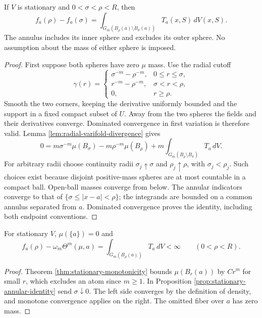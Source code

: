 \begin{proposition}\label{prop:stationary-annular-identity}
If $V$ is stationary and $0<\sigma<\rho<R$, then
\[
 f_a(\rho)-f_a(\sigma)
 =\int_{G_m(B_\rho(a)\setminus B_\sigma(a))}T_a(x,S)\,dV(x,S).
\]
The annulus includes its inner sphere and excludes its outer sphere. No assumption about the mass of either sphere is imposed.
\end{proposition}
\begin{proof}
First suppose both spheres have zero $\mu$ mass. Use the radial cutoff
\[
 \gamma(r)=\begin{cases}
 \sigma^{-m}-\rho^{-m},&0\leq r\leq\sigma,\\
 r^{-m}-\rho^{-m},&\sigma<r<\rho,\\
 0,&r\geq\rho.
 \end{cases}
\]
Smooth the two corners, keeping the derivative uniformly bounded and the support in a fixed compact subset of $U$. Away from the two spheres the fields and their derivatives converge. Dominated convergence in first variation is therefore valid. Lemma \ref{lem:radial-varifold-divergence} gives
\[
 0=m\sigma^{-m}\mu(B_\sigma)-m\rho^{-m}\mu(B_\rho)
   +m\int_{G_m(B_\rho\setminus B_\sigma)}T_a\,dV.
\]
For arbitrary radii choose continuity radii $\sigma_j\uparrow\sigma$ and $\rho_j\uparrow\rho$, with $\sigma_j<\rho_j$. Such choices exist because disjoint positive-mass spheres are at most countable in a compact ball. Open-ball masses converge from below. The annular indicators converge to that of $\{\sigma\leq|x-a|<\rho\}$; the integrands are bounded on a common annulus separated from $a$. Dominated convergence proves the identity, including both endpoint conventions.
\end{proof}

\begin{corollary}\label{cor:stationary-density-defect}
For stationary $V$, $\mu(\{a\})=0$ and
\[
 f_a(\rho)-\omega_m\Theta^m(\mu,a)
 =\int_{G_m(B_\rho(a))}T_a\,dV<\infty\qquad(0<\rho<R).
\]
\end{corollary}
\begin{proof}
Theorem \ref{thm:stationary-monotonicity} bounds $\mu(B_r(a))$ by $Cr^m$ for small $r$, which excludes an atom since $m\geq1$. In Proposition \ref{prop:stationary-annular-identity} send $\sigma\downarrow0$. The left side converges by the definition of density, and monotone convergence applies on the right. The omitted fiber over $a$ has zero mass.
\end{proof}


